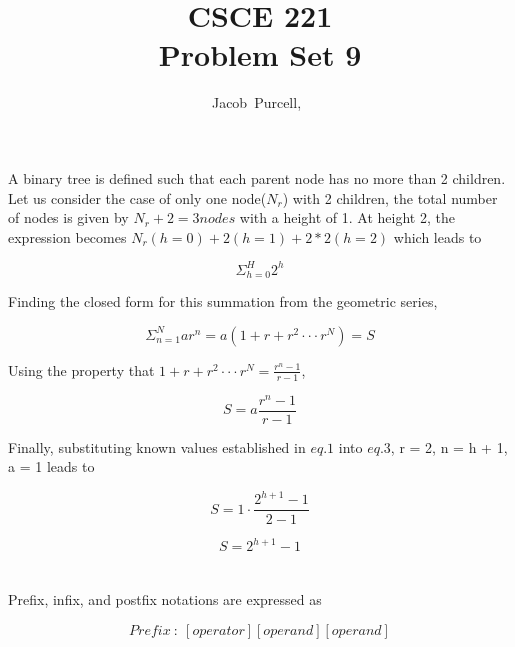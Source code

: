 \documentclass[journal]{IEEEtran}
\begin{document}
\title{CSCE 221 \\ Problem Set 9}

\author{Jacob~Purcell,~}

\maketitle
\section{}

A binary tree is defined such that each parent node has no more than 2 children. 
Let us consider the case of only one node($N_r$) with 2 children, the total
number of nodes is given by $N_r + 2 = 3 nodes$ with a height of 1. At height 2,
the expression becomes $N_r(h = 0) + 2(h = 1) + 2*2(h = 2)$ which leads to 

\begin{equation}
\Sigma_{h=0}^H 2^h
\end{equation}

Finding the closed form for this summation from the geometric series,

\begin{equation}
\Sigma_{n=1}^N ar^n = a(1 + r + r^2 \cdot \cdot \cdot r^N) = S
\end{equation}

Using the property that $1 + r + r^2 \cdot \cdot \cdot r^N = \frac{r^n - 1}{r - 1}$,

\begin{equation}
S = a \frac{r^n - 1}{r - 1}
\end{equation}

Finally, substituting known values established in $eq. 1$ into $eq. 3$, 
r = 2, n = h + 1, a = 1 leads to

\begin{equation}
S = 1 \cdot \frac{2^{h+1}-1}{2-1}
\end{equation}

\begin{equation}
\boxed{S = 2^{h+1} - 1}
\end{equation}

\section{}

Prefix, infix, and postfix notations are expressed as

\begin{equation}
    Prefix~:~[operator][operand][operand]
\end{equation}
\end{document}
